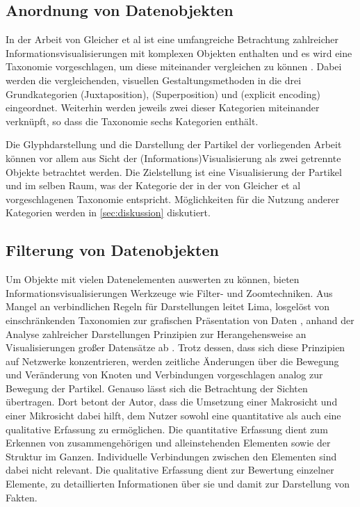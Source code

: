 \subsection*{Anordnung von Datenobjekten}\label{sec:related-visAnordnung}
In der Arbeit von Gleicher et al ist eine umfangreiche Betrachtung zahlreicher Informationsvisualisierungen mit komplexen Objekten enthalten und es wird eine Taxonomie vorgeschlagen, um diese miteinander vergleichen zu können \cite{gleicher2011visualComparison}. Dabei werden die vergleichenden, visuellen Gestaltungsmethoden in die drei Grundkategorien  (Juxtaposition),  (Superposition) und  (explicit encoding) eingeordnet. Weiterhin werden jeweils zwei dieser Kategorien miteinander verknüpft, so dass die Taxonomie sechs Kategorien enthält. %

Die Glyphdarstellung und die Darstellung der Partikel der vorliegenden Arbeit können vor allem aus Sicht der (Informations)Visualisierung als zwei getrennte Objekte betrachtet werden. Die Zielstellung ist eine Visualisierung der Partikel und  im selben Raum, was der Kategorie der  in der von Gleicher et al vorgeschlagenen Taxonomie entspricht. Möglichkeiten für die Nutzung anderer Kategorien werden in \autoref{sec:diskussion} diskutiert. %

\subsection*{Filterung von Datenobjekten}\label{sec:related-visFilter}
Um Objekte mit vielen Datenelementen auswerten zu können, bieten Informationsvisualisierungen Werkzeuge wie Filter- und Zoomtechniken. Aus Mangel an verbindlichen Regeln für Darstellungen leitet Lima, losgelöst von einschränkenden Taxonomien zur grafischen Präsentation von Daten \cite{brinton1914graphicMethods}, anhand der Analyse zahlreicher Darstellungen \cite{lima2015visualComplexity_web} Prinzipien zur Herangehensweise an Visualisierungen großer Datensätze ab \cite[S.~81-95]{lima2013visualComplexity}. Trotz dessen, dass sich diese Prinzipien auf Netzwerke konzentrieren, werden zeitliche Änderungen über die Bewegung und Veränderung von Knoten und Verbindungen vorgeschlagen analog zur Bewegung der Partikel. Genauso lässt sich die Betrachtung der Sichten übertragen. Dort betont der Autor, dass die Umsetzung einer Makrosicht und einer Mikrosicht dabei hilft, dem Nutzer sowohl eine quantitative als auch eine qualitative Erfassung zu ermöglichen. Die quantitative Erfassung dient zum Erkennen von zusammengehörigen und alleinstehenden Elementen sowie der Struktur im Ganzen. Individuelle Verbindungen zwischen den Elementen sind dabei nicht relevant. Die qualitative Erfassung dient zur Bewertung einzelner Elemente, zu detaillierten Informationen über sie und damit zur Darstellung von Fakten. %

